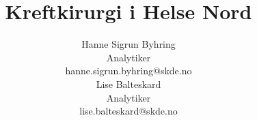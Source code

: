 \usepackage{xcolor}
\usepackage[norsk]{babel}

\usepackage[utf8]{inputenc}
\usepackage{libertine} %
\usepackage[T1]{fontenc}

\usepackage{parskip}

\usepackage{booktabs}


\usepackage{sectsty}
\allsectionsfont{\sffamily\color{skde}}

\usepackage{pdfpages} %




\makeatletter
\newcommand{\globalcolor}[1]{%
  \color{#1}\global\let\default@color\current@color
}
\makeatother

\AtBeginDocument{\globalcolor{text}}

\usepackage{framed,color}

\renewcommand{\textfraction}{0.05}
\renewcommand{\topfraction}{0.8}
\renewcommand{\bottomfraction}{0.8}
\renewcommand{\floatpagefraction}{0.75}

\title{Kreftkirurgi i Helse Nord} %
\newcommand{\subtitle}{2013-2016} %
\newcommand{\sammendrag}{Dette notatet gir en oversikt over hvilke institusjoner som utfører %
kreftkirurgi i Helse Nord RHF og omfanget av disse inngrepene i perioden 2013 til 2016, basert på tall fra Norsk pasientregister.} %
\newcommand{\notatnummer}{\today} %
\author{%
   	Hanne Sigrun Byhring \\
    Analytiker \\
    hanne.sigrun.byhring@skde.no\vspace{20pt} \\
    Lise Balteskard \\
    Analytiker \\
    lise.balteskard@skde.no
}

\newcommand{\hoydestrek}{125pt} %

\usepackage{amsmath}
\usepackage{tikz}
\usepackage{epigraph}

